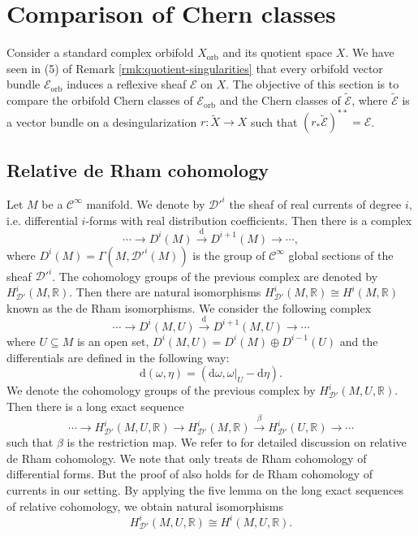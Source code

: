 \documentclass[12pt]{amsart}
\newcommand{\<}{\leq}
\def\subset{\subseteq}
\def\mcE{\mathcal{E}}
\theoremstyle{remark}
\theoremstyle{definition}
\theoremstyle{definition}
\numberwithin{equation}{section}
\theoremstyle{definition}
\theoremstyle{definition}
\def\orb{\mathrm{orb}}
\begin{document}
\section{Comparison of Chern classes} 
\label{section:compare-Chern}

Consider a standard complex  orbifold  $X_{\orb}$ and its quotient space $X$. 
We have seen in (5) of Remark \ref{rmk:quotient-singularities} that every orbifold vector bundle $\mcE_{\orb}$ induces a reflexive sheaf $\mcE$ on $X$.  
The objective of this section is to compare the orbifold Chern classes of $ \mcE_{\orb} $ and the  Chern classes of $\widetilde{\mcE}$, where $\widetilde{\mcE}$ is a vector bundle on  a desingularization $r\colon \widetilde{X} \to X$ such that $(r_*\widetilde{\mcE})^{**} = \mcE$. 

  


\subsection{Relative de Rham cohomology}
Let $M$ be a $\mathcal{C}^\infty$ manifold. 
We denote by $\mathscr{D}'^i$  the sheaf of real currents of degree $i$, i.e.
 differential $i$-forms with  real distribution coefficients. 
Then there is a complex 
\[ \cdots \to D^{i}(M) \overset{\mathrm{d}}{\to} D^{i+1}(M) \to \cdots,
\] 
where $D^i(M) = \Gamma(M, \mathscr{D}'^i(M))$ is the group of  $\mathcal{C}^\infty$ global sections of the sheaf $\mathscr{D}'^i$. 
The cohomology groups of the previous complex are denoted by  $H^{i}_{\mathscr{D}'}(M, \mathbb{R})$. 
Then there are natural isomorphisms $H^{i}_{\mathscr{D}'}(M, \mathbb{R}) \cong H^{i}(M, \mathbb{R})$ known as the  de Rham isomorphisms. 
We consider the following complex
\[ \cdots \to D^{i}(M,U) \overset{\mathrm{d}}{\to} D^{i+1}(M,U) \to \cdots  \]
where $U\subset M$ is an open set,  $D^{i}(M,U) = D^i(M) \oplus D^{i-1}(U)$ and the differentials are defined in the following way: 
\[ \mathrm{d}(\omega, \eta) = (\mathrm{d}\omega, \omega|_U - \mathrm{d}\eta). \]
We  denote the cohomology  groups of the previous complex by $H^{i}_{\mathscr{D}'}(M,U, \mathbb{R})$.  
Then there is a long exact sequence 
\[
\cdots \to H^{i}_{\mathscr{D}'}(M,U, \mathbb{R}) \to H^{i}_{\mathscr{D}'}(M, \mathbb{R}) \overset{\beta}{\to} H^{i}_{\mathscr{D}'}(U, \mathbb{R}) \to \cdots
\]
such that $\beta$ is the restriction map. 
We refer to \cite[Page 78-79]{BottTu1982} for detailed discussion on relative de Rham cohomology. 
We note that  \cite{BottTu1982}  only treats de Rham cohomology of differential forms. 
But the proof of \cite[Claim 6.48]{BottTu1982} also holds for de Rham cohomology of currents in our setting. 
By applying the five lemma on the long exact sequences of relative cohomology,  
we obtain  natural  isomorphisms 
\[ H^{i}_{\mathscr{D}'}(M,U, \mathbb{R}) \cong H^{i}(M,U, \mathbb{R}). \]
\end{document}
